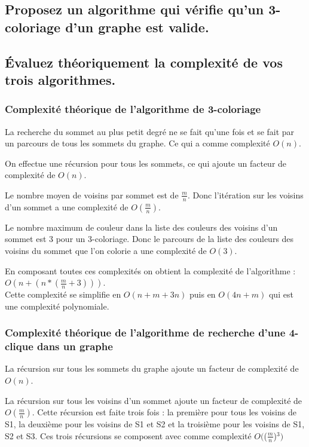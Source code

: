\documentclass[a4paper, 11pt]{article}
\begin{document}
    \subsection{Proposez un algorithme qui vérifie qu'un 3-coloriage d'un graphe est valide.}\label{subsec:Q3D}
    

    \subsection{Évaluez théoriquement la complexité de vos trois algorithmes.}\label{subsec:Q3E}
    \subsubsection{Complexité théorique de l'algorithme de 3-coloriage}\label{subsubsec:Q3E1}
    La recherche du sommet au plus petit degré ne se fait qu'une fois et se fait par un parcours de tous les sommets du graphe.
    Ce qui a comme complexité $O(n)$.

    On effectue une récursion pour tous les sommets, ce qui ajoute un facteur de complexité de $O(n)$.

    Le nombre moyen de voisins par sommet est de $\frac{m}{n}$.
    Donc l'itération sur les voisins d'un sommet a une complexité de $O(\frac{m}{n})$.

    Le nombre maximum de couleur dans la liste des couleurs des voisins d'un sommet est 3 pour un 3-coloriage.
    Donc le parcours de la liste des couleurs des voisins du sommet que l'on colorie a une complexité de $O(3)$.

    En composant toutes ces complexités on obtient la complexité de l'algorithme : $O\left(n+\left(n*\left(\frac{m}{n}+3\right)\right)\right)$.\\
    Cette complexité se simplifie en $O(n+m+3n)$ puis en $O(4n+m)$ qui est une complexité polynomiale.

    \subsubsection{Complexité théorique de l'algorithme de recherche d'une 4-clique dans un graphe}\label{subsubsec:Q3E2}
    La récursion sur tous les sommets du graphe ajoute un facteur de complexité de $O(n)$.

    La récursion sur tous les voisins d'un sommet ajoute un facteur de complexité de $O\left(\frac{m}{n}\right)$.
    Cette récursion est faite trois fois :
    la première pour tous les voisins de S1, la deuxième pour les voisins de S1 et S2 et la troisième pour les voisins de S1, S2 et S3.
    Ces trois récursions se composent avec comme complexité $O($($\frac{m}{n}$)$^3)$
\end{document}
